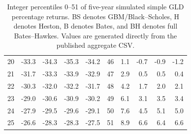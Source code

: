 \documentclass[a4paper,10pt,titlepage,oneside,openany]{book}
\theoremstyle{plain}
\theoremstyle{definition}
\theoremstyle{remark}
\begin{document}
\begin{table}[p]
\begin{tabular}{@{}rrrrr@{\hspace{8mm}}rrrrr@{}}
20 & -33.3 & -34.3 & -35.3 & -34.2 & 46 & 1.1 & -0.7 & -0.9 & -1.2 \\
21 & -31.7 & -33.3 & -33.9 & -32.9 & 47 & 2.9 & 0.5 & 0.5 & 0.4 \\
22 & -30.3 & -32.0 & -32.2 & -31.7 & 48 & 4.2 & 1.7 & 2.0 & 2.1 \\
23 & -29.0 & -30.6 & -30.9 & -30.2 & 49 & 6.1 & 3.1 & 3.5 & 3.4 \\
24 & -27.9 & -29.5 & -29.6 & -29.1 & 50 & 7.6 & 4.5 & 5.1 & 5.0 \\
25 & -26.6 & -28.3 & -28.3 & -27.5 & 51 & 8.9 & 6.6 & 6.4 & 6.6 \\
\bottomrule
\end{tabular}
\caption{Integer percentiles 0--51 of five-year simulated simple GLD percentage returns. BS denotes GBM/Black--Scholes, H denotes Heston, B denotes Bates, and BH denotes full Bates--Hawkes. Values are generated directly from the published aggregate CSV.}
\label{tab:appendix-percentiles-0-51}
\end{table}
\clearpage
\end{document}
